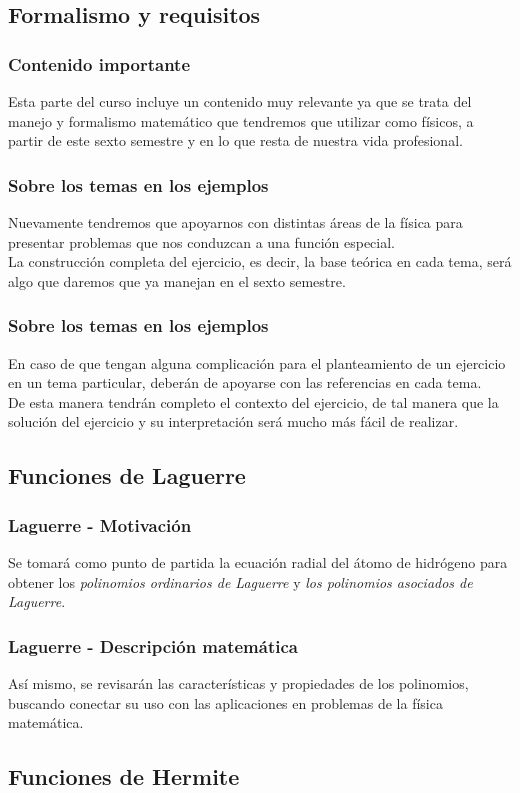 \documentclass[12pt]{beamer}
\begin{document}
\subsection{Formalismo y requisitos}


\begin{frame}
\frametitle{Contenido importante}
Esta parte del curso incluye un contenido muy relevante ya que se trata del manejo y formalismo matemático que tendremos que utilizar como físicos, a partir de este sexto semestre y en lo que resta de nuestra vida profesional.
\end{frame}
\begin{frame}
\frametitle{Sobre los temas en los ejemplos}
Nuevamente tendremos que apoyarnos con distintas áreas de la física para presentar problemas que nos conduzcan a una función especial.
\\
\bigskip
\pause
La construcción completa del ejercicio, es decir, la base teórica en cada tema, será algo que daremos que ya manejan en el sexto semestre.
\end{frame}
\begin{frame}
\frametitle{Sobre los temas en los ejemplos}
En caso de que tengan alguna complicación para el planteamiento de un ejercicio en un tema particular, deberán de apoyarse con las referencias en cada tema.
\\
\bigskip
\pause
De esta manera tendrán completo el contexto del ejercicio, de tal manera que la solución del ejercicio y su interpretación será mucho más fácil de realizar.
\end{frame}

\subsection{Funciones de Laguerre}

\begin{frame}
\frametitle{Laguerre - Motivación}
Se tomará como punto de partida la ecuación radial del átomo de hidrógeno para obtener los \emph{polinomios ordinarios de Laguerre} y \emph{los polinomios asociados de Laguerre}.
\end{frame}
\begin{frame}
\frametitle{Laguerre - Descripción matemática}
Así mismo, se revisarán las características y propiedades de los polinomios, buscando conectar su uso con las aplicaciones en problemas de la física matemática.
\end{frame}

\subsection{Funciones de Hermite}
\end{document}
